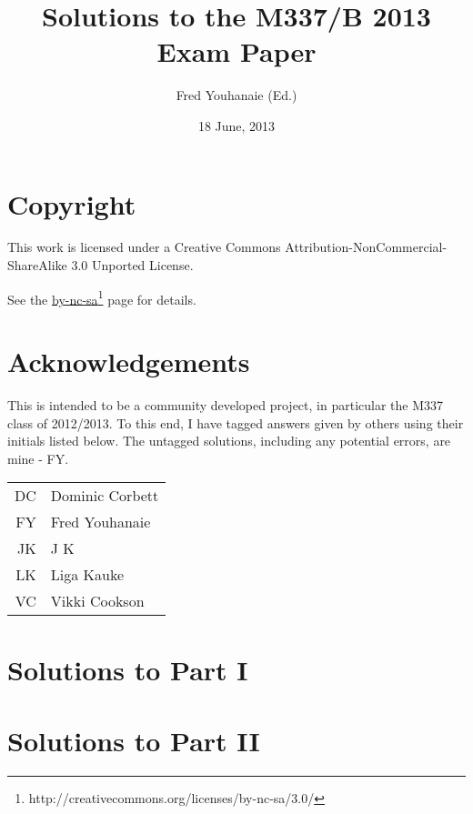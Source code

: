 \documentclass[a4paper,fleqn,12pt,twoside]{article}
\title{Solutions to the M337/B 2013 Exam Paper}
\author{Fred Youhanaie (Ed.)}
\date{18 June, 2013}
\begin{document}
\maketitle

\pagestyle{myheadings}

\section*{Copyright}

This work is licensed under a Creative Commons
Attribution-NonCommercial-ShareAlike 3.0 Unported License.

\newcommand\cclink{http://creativecommons.org/licenses/by-nc-sa/3.0/}
See the \href{\cclink}{by-nc-sa}\footnote{\cclink} page for details.

\section*{Acknowledgements}

This is intended to be a community developed project, in particular the
M337 class of 2012/2013. To this end, I have tagged answers given by
others using their initials listed below. The untagged solutions, including
any potential errors, are mine - FY.

\medskip

\begin{tabular}{r|l}
\hline
DC	& Dominic Corbett \\
FY	& Fred Youhanaie \\
JK	& J K \\
LK	& Liga Kauke \\
VC	& Vikki Cookson \\
\hline
\end{tabular}

\newpage
\section*{Solutions to Part I}

\newpage

\newpage

\newpage

\newpage

\newpage

\newpage

\newpage

\newpage

\section*{Solutions to Part II}

\newpage

\newpage

\newpage

\end{document}
